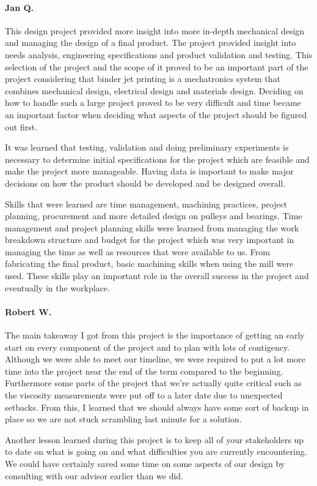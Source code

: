 \documentclass[11pt]{article}
\begin{document}
\begin{appendices}
\newpage
\paragraph*{Jan Q.}
This design project provided more insight into more in-depth mechanical design and managing the design of a final product. The project provided insight into needs analysis, engineering specifications and product validation and testing. This selection of the project and the scope of it proved to be an important part of the project considering that binder jet printing is a mechatronics system that combines mechanical design, electrical design and materials design.
Deciding on how to handle such a large project proved to be very difficult and time became an important factor when deciding what aspects of the project should be figured out first.

It was learned that testing, validation and doing preliminary experiments is necessary to determine initial specifications for the project which are feasible and make the project more manageable. Having data is important to make major decisions on how the product should be developed and be designed overall.

Skills that were learned are time management, machining practices, project planning, procurement and more detailed design on pulleys and bearings. Time management and project planning skills were learned from managing the work breakdown structure and budget for the project which was very important in managing the time as well as resources that were available to us. From fabricating the final product, basic machining skills when using the mill were used. These skills play an important role in the overall success in the project and eventually in the workplace.

\newpage
\paragraph*{Robert W.}
The main takeaway I got from this project is the importance of getting an early start on every component of the project and to plan with lots of contigency. Although we were able to meet our timeline, we were required to put a lot more time into the project near the end of the term compared to the beginning. Furthermore some parts of the project that we're actually quite critical such as the viscosity measurements were put off to a later date due to unexpected setbacks. From this, I learned that we should always have some sort of backup in place so we are not stuck scrambling last minute for a solution.

Another lesson learned during this project is to keep all of your stakeholders up to date on what is going on and what difficulties you are currently encountering. We could have certainly saved some time on some aspects of our design by consulting with our advisor earlier than we did. 

\end{appendices}
\end{document}
